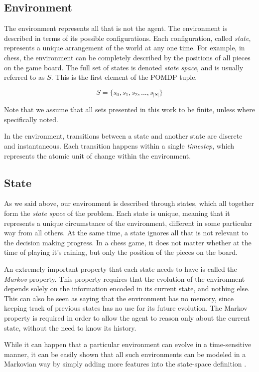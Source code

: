 \subsection{Environment}

The environment represents all that is not the agent. The environment is described in terms of its
possible configurations.  Each configuration, called \textit{state}, represents a unique
arrangement of the world at any one time. For example, in chess, the environment can be completely
described by the positions of all pieces on the game board. The full set of states is denoted
\textit{state space}, and is usually referred to as $S$. This is the first element of the POMDP
tuple.

\[ S = \{s_0, s_1, s_2, ..., s_{|S|}\} \]

Note that we assume that all sets presented in this work to be finite, unless where specifically
noted.

In the environment, transitions between a state and another state are discrete and instantaneous.
Each transition happens within a single \textit{timestep}, which represents the atomic unit of
change within the environment.

\subsection{State}

As we said above, our environment is described through states, which all together form the
\textit{state space} of the problem. Each state is unique, meaning that it represents a unique
circumstance of the environment, different in some particular way from all others. At the same time,
a state ignores all that is not relevant to the decision making progress. In a chess game, it does
not matter whether at the time of playing it's raining, but only the position of the pieces on the
board.

An extremely important property that each state needs to have is called the \textit{Markov}
property. This property requires that the evolution of the environment depends solely on the
information encoded in its current state, and nothing else. This can also be seen as saying that the
environment has no memory, since keeping track of previous states has no use for its future
evolution. The Markov property is required in order to allow the agent to reason only about the
current state, without the need to know its history.

While it can happen that a particular environment can evolve in a time-sensitive manner, it can be
easily shown that all such environments can be modeled in a Markovian way by simply adding more
features into the state-space definition \cite{cit:boutilier}.

